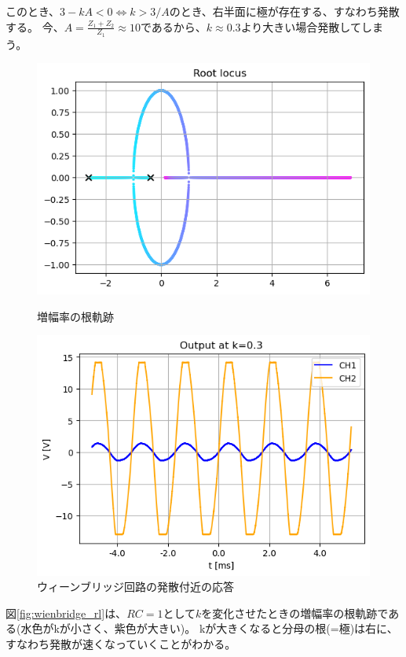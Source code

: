 \documentclass[a4paper]{ltjsarticle}
\begin{document}
このとき、$3-kA<0\Leftrightarrow k>3/A$のとき、右半面に極が存在する、すなわち発散する。
今、$A=\frac{Z_1+Z_2}{Z_1}\approx10$であるから、$k\approx0.3$より大きい場合発散してしまう。
\begin{figure}[htbp]
    \centering
        \begin{minipage}{0.48\columnwidth}
            \centering
            \includegraphics[width=0.95\columnwidth]{./images/wienbridge_rl.png}
            \caption{増幅率の根軌跡}
            \label{fig:wienbridge_rl}
        \end{minipage}
        \begin{minipage}{0.48\columnwidth}
            \centering
            \includegraphics[width=0.95\columnwidth]{./images/wienbridge_response.png}
            \caption{ウィーンブリッジ回路の発散付近の応答}
            \label{fig:wienbridge_response}
        \end{minipage}
\end{figure}
図\ref{fig:wienbridge_rl}は、$RC=1$として$k$を変化させたときの増幅率の根軌跡である(水色がkが小さく、紫色が大きい)。
kが大きくなると分母の根(=極)は右に、すなわち発散が速くなっていくことがわかる。
\end{document}

